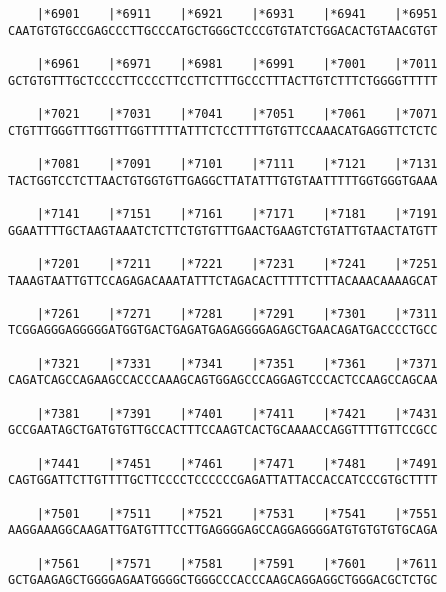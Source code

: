 \documentclass{article}
\begin{document}
\begin{Verbatim}
    |*6901    |*6911    |*6921    |*6931    |*6941    |*6951
CAATGTGTGCCGAGCCCTTGCCCATGCTGGGCTCCCGTGTATCTGGACACTGTAACGTGT
                                                            
    |*6961    |*6971    |*6981    |*6991    |*7001    |*7011
GCTGTGTTTGCTCCCCTTCCCCTTCCTTCTTTGCCCTTTACTTGTCTTTCTGGGGTTTTT
                                                            
    |*7021    |*7031    |*7041    |*7051    |*7061    |*7071
CTGTTTGGGTTTGGTTTGGTTTTTATTTCTCCTTTTGTGTTCCAAACATGAGGTTCTCTC
                                                            
    |*7081    |*7091    |*7101    |*7111    |*7121    |*7131
TACTGGTCCTCTTAACTGTGGTGTTGAGGCTTATATTTGTGTAATTTTTGGTGGGTGAAA
                                                            
    |*7141    |*7151    |*7161    |*7171    |*7181    |*7191
GGAATTTTGCTAAGTAAATCTCTTCTGTGTTTGAACTGAAGTCTGTATTGTAACTATGTT
                                                            
    |*7201    |*7211    |*7221    |*7231    |*7241    |*7251
TAAAGTAATTGTTCCAGAGACAAATATTTCTAGACACTTTTTCTTTACAAACAAAAGCAT
                                                            
    |*7261    |*7271    |*7281    |*7291    |*7301    |*7311
TCGGAGGGAGGGGGATGGTGACTGAGATGAGAGGGGAGAGCTGAACAGATGACCCCTGCC
                                                            
    |*7321    |*7331    |*7341    |*7351    |*7361    |*7371
CAGATCAGCCAGAAGCCACCCAAAGCAGTGGAGCCCAGGAGTCCCACTCCAAGCCAGCAA
                                                            
    |*7381    |*7391    |*7401    |*7411    |*7421    |*7431
GCCGAATAGCTGATGTGTTGCCACTTTCCAAGTCACTGCAAAACCAGGTTTTGTTCCGCC
                                                            
    |*7441    |*7451    |*7461    |*7471    |*7481    |*7491
CAGTGGATTCTTGTTTTGCTTCCCCTCCCCCCGAGATTATTACCACCATCCCGTGCTTTT
                                                            
    |*7501    |*7511    |*7521    |*7531    |*7541    |*7551
AAGGAAAGGCAAGATTGATGTTTCCTTGAGGGGAGCCAGGAGGGGATGTGTGTGTGCAGA
                                                            
    |*7561    |*7571    |*7581    |*7591    |*7601    |*7611
GCTGAAGAGCTGGGGAGAATGGGGCTGGGCCCACCCAAGCAGGAGGCTGGGACGCTCTGC
                                                            

\end{Verbatim}
\end{document}
